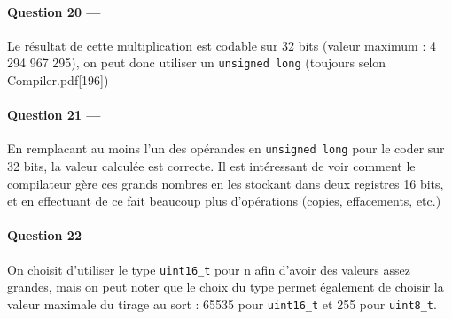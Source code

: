 \documentclass[a4paper,11pt,article]{memoir}
\begin{document}
\paragraph{Question 20 ---}  Le résultat de cette multiplication est codable sur 32 bits (valeur maximum : 4 294 967 295), on peut donc utiliser un \verb|unsigned long| (toujours selon Compiler.pdf[196])

\paragraph{Question 21 ---}  En remplacant au moins l'un des opérandes en \verb|unsigned long| pour le coder sur 32 bits, la valeur calculée est correcte. Il est intéressant de voir comment le compilateur gère ces grands nombres en les stockant dans deux registres 16 bits, et en effectuant de ce fait beaucoup plus d'opérations (copies, effacements, etc.)

\paragraph{Question 22 --}  On choisit d'utiliser le type \verb|uint16_t| pour n afin d'avoir des valeurs assez grandes, mais on peut noter que le choix du type permet également de choisir la valeur maximale du tirage au sort : 65535 pour \verb|uint16_t| et 255 pour \verb|uint8_t|.
\end{document}
